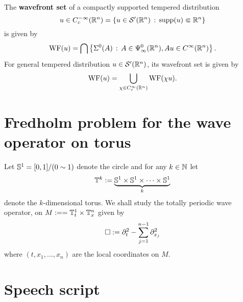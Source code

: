 \documentclass{article}
\begin{document}
\begin{fdefinition}
    The \textbf{wavefront set} of a compactly supported tempered distribution 
    \[
    u \in C^{-\infty}_c(\R^n) = \set{u \in \sch'(\R^n) \wh \supp(u) \Subset \R^n} 
    \]
    is given by 
    \begin{align*}
    \WF(u) = \bigcap \set{\Char^0(A) \wh A \in \Psi^0_\infty(\R^n), Au \in C^\infty(\R^n)}. 
    \end{align*}
    For general tempered distribution $u \in \sch'(\R^n)$, its wavefront set is given by 
    \begin{align*}
    \WF(u) = \bigcup_{\chi \in C^\infty_c(\R^n)} \WF(\chi u). 
    \end{align*}
\end{fdefinition} 



\section{Fredholm problem for the wave operator on torus} 

\begin{definition} 
    Let $\S^1 = [0,1] / (0 \sim 1)$ denote the circle and for any $k \in \N$ let
    \begin{align*}
    \T^k := \underbrace{\S^1 \times \S^1 \times \dots \times \S^1}_{k}
    \end{align*}
    denote the $k$-dimensional torus. We shall study the totally periodic wave operator, on $M :=  = \T_t^1 \times \T_x^{n}$ given by
    \begin{align}\label{eq: d'Alembertian}
    \Box := \p_t^2 - \sum_{j = 1}^{n -1} \p_{x_j}^2
    \end{align}
    where $(t, x_1, \dots, x_n)$ are the local coordinates on $M$. 
\end{definition}


\pagebreak
\section{Speech script} 





\pagebreak 
\appendix
\end{document}
